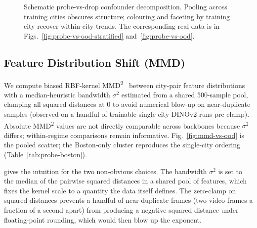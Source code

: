 \begin{figure}[ht]
{}
    \caption[Probe-vs-drop confounder decomposition, schematic.]{Schematic probe-vs-drop confounder decomposition. Pooling across training cities obscures structure; colouring and faceting by training city recover within-city trends. The corresponding real data is in Figs.~\ref{fig:probe-vs-ood-stratified} and~\ref{fig:probe-vs-ood}.}
    \label{fig:exp-probe-confounder}
\end{figure}

\subsection{Feature Distribution Shift (MMD)}
\label{sec:exp-mmd}

We compute biased RBF-kernel MMD\textsuperscript{2}~\cite{gretton-mmd-2012} between city-pair feature distributions with a median-heuristic bandwidth $\sigma^2$ estimated from a shared 500-sample pool, clamping all squared distances at 0 to avoid numerical blow-up on near-duplicate samples (observed on a handful of trainable single-city DINOv2 runs pre-clamp). Absolute MMD\textsuperscript{2} values are not directly comparable across backbones because $\sigma^2$ differs; within-regime comparisons remain informative. Fig.~\ref{fig:mmd-vs-ood} is the pooled scatter; the Boston-only cluster reproduces the single-city ordering (Table~\ref{tab:probe-boston}).

 gives the intuition for the two non-obvious choices. The bandwidth $\sigma^2$ is set to the median of the pairwise squared distances in a shared pool of features, which fixes the kernel scale to a quantity the data itself defines. The zero-clamp on squared distances prevents a handful of near-duplicate frames (two video frames a fraction of a second apart) from producing a negative squared distance under floating-point rounding, which would then blow up the exponent.

